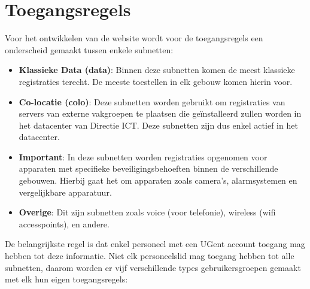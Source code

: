 \section{Toegangsregels}
\label{toegangsregels}
Voor het ontwikkelen van de website wordt voor de toegangsregels een onderscheid gemaakt tussen enkele subnetten: 
\begin{itemize}
    \item \textbf{Klassieke Data (data)}: Binnen deze subnetten komen de meest klassieke registraties terecht. De meeste toestellen in elk gebouw komen hierin voor.
    \item \textbf{Co-locatie (colo)}: Deze subnetten worden gebruikt om registraties van servers van externe vakgroepen te plaatsen die geïnstalleerd zullen worden in het datacenter van Directie ICT. Deze subnetten zijn dus enkel actief in het datacenter.
    \item \textbf{Important}: In deze subnetten worden registraties opgenomen voor apparaten met specifieke beveiligingsbehoeften binnen de verschillende gebouwen. Hierbij gaat het om apparaten zoals camera's, alarmsystemen en vergelijkbare apparatuur.
    \item \textbf{Overige}: Dit zijn subnetten zoals voice (voor telefonie), wireless (wifi access\-points), en andere.
\end{itemize} 
De belangrijkste regel is dat enkel personeel met een UGent account toegang mag hebben tot deze informatie.
Niet elk personeelslid mag toegang hebben tot alle subnetten, daarom worden er vijf verschillende types gebruikersgroepen gemaakt met elk hun eigen toegangsregels:
